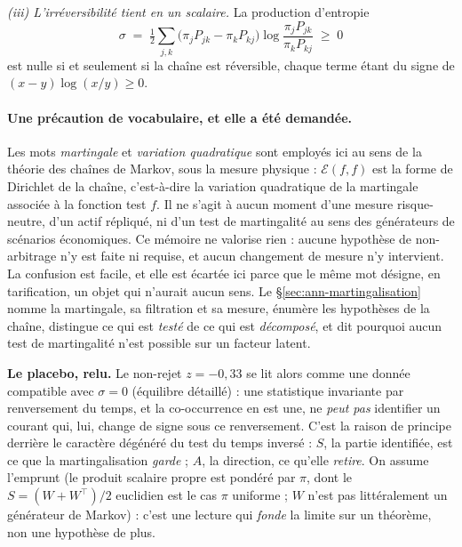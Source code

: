 \emph{(iii) L'irréversibilité tient en un scalaire.} La production d'entropie
\begin{equation}
  \sigma \;=\; \tfrac12\sum_{j,k}\bigl(\pi_j P_{jk}-\pi_k P_{kj}\bigr)
                \log\frac{\pi_j P_{jk}}{\pi_k P_{kj}} \;\geq\; 0
  \label{eq:entropie}
\end{equation}
est nulle si et seulement si la chaîne est réversible, chaque terme étant du signe de
$(x-y)\log(x/y)\geq 0$.

\paragraph{Une précaution de vocabulaire, et elle a été demandée.} Les mots \emph{martingale} et
\emph{variation quadratique} sont employés ici au sens de la théorie des chaînes de Markov, sous
la mesure physique : $\mathcal{E}(f,f)$ est la forme de Dirichlet de la chaîne, c'est-à-dire
la variation quadratique de la martingale associée à la fonction test $f$. Il ne s'agit à aucun
moment d'une mesure risque-neutre, d'un actif répliqué, ni d'un \og{}test de
martingalité\fg{} au sens des générateurs de scénarios économiques. Ce mémoire ne valorise
rien : aucune hypothèse de non-arbitrage n'y est faite ni requise, et aucun changement de
mesure n'y intervient. La confusion est facile, et elle est écartée ici
parce que le même mot désigne, en tarification, un objet qui n'aurait aucun sens. Le
\S\ref{sec:ann-martingalisation} nomme la martingale, sa filtration et sa mesure, énumère les
hypothèses de la chaîne, distingue ce qui est \emph{testé} de ce qui est \emph{décomposé}, et
dit pourquoi aucun test de martingalité n'est possible sur un facteur latent.

\begin{cle}
\textbf{Le placebo, relu.} Le non-rejet $z=-0{,}33$ se lit alors comme une donnée
compatible avec $\sigma=0$ (équilibre détaillé) : une statistique invariante par
renversement du temps, et la co-occurrence en est une, ne \emph{peut pas} identifier un
courant qui, lui, change de signe sous ce renversement. C'est la raison de principe derrière le
caractère dégénéré du test du \og temps inversé \fg{} : $S$, la partie identifiée, est ce que la
martingalisation \emph{garde} ; $A$, la direction, ce qu'elle \emph{retire}. On assume l'emprunt
(le produit scalaire propre est pondéré par $\pi$, dont le $S=(W+W^\top)/2$ euclidien est le cas
$\pi$ uniforme ; $W$ n'est pas littéralement un générateur de Markov) : c'est une lecture qui
\emph{fonde} la limite sur un théorème, non une hypothèse de plus.
\end{cle}

